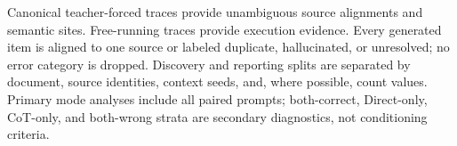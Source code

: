 Canonical teacher-forced traces provide unambiguous source alignments and semantic sites. Free-running traces provide execution evidence. Every generated item is aligned to one source or labeled duplicate, hallucinated, or unresolved; no error category is dropped. Discovery and reporting splits are separated by document, source identities, context seeds, and, where possible, count values. Primary mode analyses include all paired prompts; both-correct, Direct-only, CoT-only, and both-wrong strata are secondary diagnostics, not conditioning criteria.
